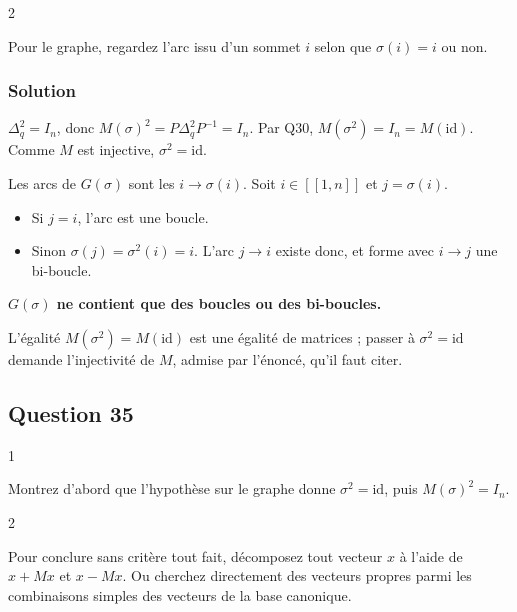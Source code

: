 \documentclass[11pt,a4paper]{article}
\providecommand{\tightlist}{\setlength{\itemsep}{0pt}\setlength{\parskip}{0pt}}
\begin{document}
\begin{indication}{2}

Pour le graphe, regardez l'arc issu d'un sommet \(i\) selon que \(\sigma(i)=i\) ou non.

\end{indication}

\hypertarget{solution-33}{%
\subsubsection{Solution}\label{solution-33}}

\(\Delta_q^2=I_n\), donc \(M(\sigma)^2=P\Delta_q^2P^{-1}=I_n\). Par Q30, \(M(\sigma^2)=I_n=M(\mathrm{id})\). Comme \(M\) est injective, \(\boxed{\sigma^2=\mathrm{id}.}\)

Les arcs de \(G(\sigma)\) sont les \(i\to\sigma(i)\). Soit \(i\in[\![1,n]\!]\) et \(j=\sigma(i)\).

\begin{itemize}
\tightlist
\item
  Si \(j=i\), l'arc est une boucle.
\item
  Sinon \(\sigma(j)=\sigma^2(i)=i\). L'arc \(j\to i\) existe donc, et forme avec \(i\to j\) une bi-boucle.
\end{itemize}

\textbf{\(G(\sigma)\) ne contient que des boucles ou des bi-boucles.}

\begin{piege}

L'égalité \(M(\sigma^2)=M(\mathrm{id})\) est une égalité de matrices ; passer à \(\sigma^2=\mathrm{id}\) demande l'injectivité de \(M\), admise par l'énoncé, qu'il faut citer.

\end{piege}

\hypertarget{question-35}{%
\subsection{Question 35}\label{question-35}}

\begin{indication}{1}

Montrez d'abord que l'hypothèse sur le graphe donne \(\sigma^2=\mathrm{id}\), puis \(M(\sigma)^2=I_n\).

\end{indication}

\begin{indication}{2}

Pour conclure sans critère tout fait, décomposez tout vecteur \(x\) à l'aide de \(x+Mx\) et \(x-Mx\). Ou cherchez directement des vecteurs propres parmi les combinaisons simples des vecteurs de la base canonique.

\end{indication}
\end{document}
